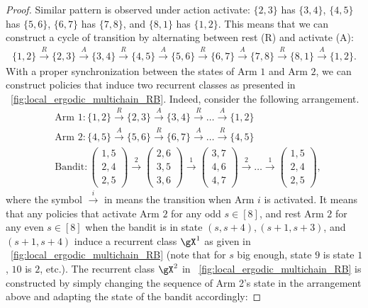 \begin{proof}
    Similar pattern is observed under action activate: $\{2,3\}$ has $\{3,4\}$, $\{4,5\}$ has $\{5,6\}$, $\{6,7\}$ has $\{7,8\}$, and $\{8,1\}$ has $\{1,2\}$.
    This means that we can construct a cycle of transition by alternating between rest (R) and activate (A):
    \begin{align*}
        \{1,2\} \overset{R}{\to} \{2,3\} \overset{A}{\to} \{3,4\} \overset{R}{\to} \{4,5\} \overset{A}{\to} \{5,6\} \overset{R}{\to} \{6,7\} \overset{A}{\to} \{7,8\} \overset{R}{\to} \{8,1\} \overset{A}{\to} \{1,2\}.
    \end{align*}
    With a proper synchronization between the states of Arm $1$ and Arm $2$, we can construct policies that induce two recurrent classes as presented in \figurename~\ref{fig:local_ergodic_multichain_RB}.
    Indeed, consider the following arrangement.
    \begin{align}
        &\text{Arm 1} : \{1,2\} \overset{R}{\to} \{2,3\} \overset{A}{\to} \{3,4\} \overset{R}{\to} \dots \overset{A}{\to} \{1,2\} \nonumber \\
        &\text{Arm 2} : \{4,5\} \overset{A}{\to} \{5,6\} \overset{R}{\to} \{6,7\} \overset{A}{\to} \dots \overset{R}{\to} \{4,5\} \nonumber \\
        &\text{Bandit} : \begin{pmatrix}1,5\\2,4\\2,5\end{pmatrix} \overset{2}{\to} \begin{pmatrix}2,6\\3,5\\3,6\end{pmatrix} \overset{1}{\to} \begin{pmatrix}3,7\\4,6\\4,7\end{pmatrix} \overset{2}{\to} \dots \overset{1}{\to} \begin{pmatrix}1,5\\2,4\\2,5\end{pmatrix}, \label{eq:mdp_transition}
    \end{align}
    where the symbol $\overset{i}{\to}$ in  means the transition when Arm $i$ is activated.
    It means that any policies that activate Arm $2$ for any odd $s\in[8]$, and rest Arm $2$ for any even $s\in[8]$ when the bandit is in state $(s,s+4), (s+1,s+3)$, and $(s+1,s+4)$ induce a recurrent class $\gX^1$ as given in \figurename~\ref{fig:local_ergodic_multichain_RB} (note that for $s$ big enough, state $9$ is state $1$, $10$ is $2$, etc.).
    The recurrent class $\gX^2$ in \figurename~\ref{fig:local_ergodic_multichain_RB} is constructed by simply changing the sequence of Arm 2's state in the arrangement above and adapting the state of the bandit accordingly:


\end{proof}
